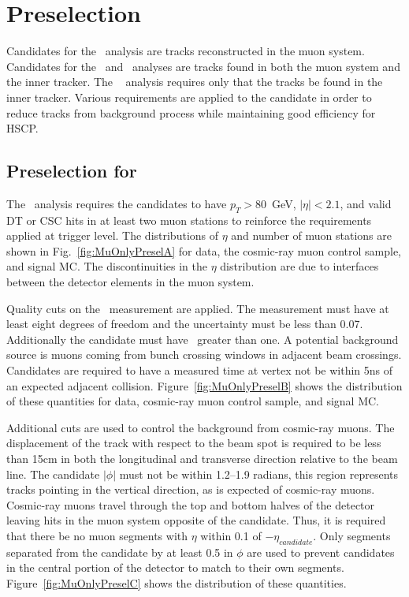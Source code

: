 \section{Preselection \label{sec:preselection}}
Candidates for the \muononly\ analysis are tracks reconstructed in the muon system. Candidates for the \tktof\ and \multi\ analyses are tracks found in both the muon
system and the inner tracker. The \tkonly\
analysis requires only that the tracks be found in the inner tracker.
Various requirements are applied to the candidate in order to reduce tracks from background process while maintaining good efficiency for HSCP.

\subsection{Preselection for \muononly\ \label{sec:muonlypreselection}}

The \muononly\ analysis requires the candidates to have $p_T > 80$~GeV, $|\eta| < 2.1$, and valid DT or CSC hits in at least two muon stations
to reinforce the requirements applied at trigger level. 
The distributions of $\eta$ and number of muon stations are shown in Fig.~\ref{fig:MuOnlyPreselA} for data, the cosmic-ray muon control sample, and signal MC.
The discontinuities in the $\eta$ distribution are due to interfaces between the detector elements in the muon system.

Quality cuts on the \invbeta\ measurement are applied. The measurement must have at least eight degrees of freedom and the uncertainty must be less than 0.07.
Additionally the candidate must have \invbeta\ greater than one.
A potential background source is muons coming from bunch crossing windows in adjacent beam crossings. 
Candidates are required to have a measured time at vertex not be within 5ns of an expected adjacent collision.
Figure~\ref{fig:MuOnlyPreselB} shows the distribution of these quantities for data, cosmic-ray muon control sample, and signal MC.

Additional cuts are used to control the background from cosmic-ray muons. The displacement of the track
with respect to the beam spot is required to be less than 15cm in both the longitudinal and transverse direction relative to the beam line. 
The candidate $|\phi|$ must not be within 1.2--1.9 radians, this region represents tracks pointing in the vertical
direction, as is expected of cosmic-ray muons. Cosmic-ray muons travel 
through the top and bottom halves of the detector leaving hits in the muon system opposite of the candidate.
Thus, it is required that  there be no muon segments with $\eta$ within 0.1 of $-\eta_{candidate}$. Only segments separated from the candidate by at least 0.5 in $\phi$
are used to prevent candidates in the central portion of the detector to match to their own segments.
Figure~\ref{fig:MuOnlyPreselC} shows the distribution of these quantities.

